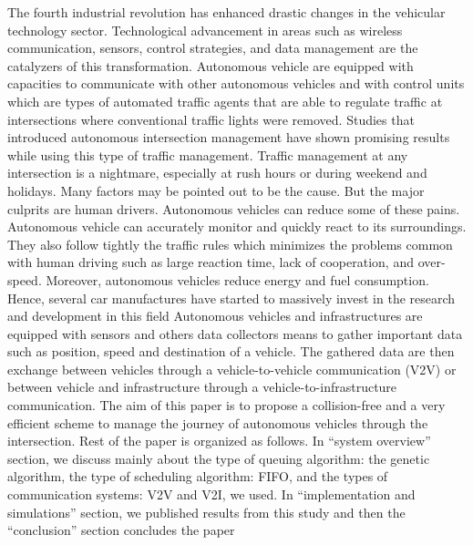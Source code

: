 \documentclass[conference]{IEEEtran}
\begin{document}
The fourth industrial revolution has enhanced drastic changes in the vehicular technology sector. Technological advancement in areas such as wireless communication, sensors, control strategies, and data management are the catalyzers of this transformation. Autonomous vehicle are equipped with capacities to communicate with other autonomous vehicles and with control units which are types of automated traffic agents that are able to regulate traffic at intersections where conventional traffic lights were removed. Studies that introduced autonomous intersection management have shown promising results while using this type of traffic management.    \newline
Traffic management at any intersection is a nightmare, especially at rush hours or during weekend and holidays. Many factors may be pointed out to be the cause. But the major culprits are human drivers. Autonomous vehicles can reduce some of these pains. Autonomous vehicle can accurately monitor and quickly react to its surroundings. They also follow tightly the traffic rules which minimizes the problems common with human driving such as large reaction time, lack of cooperation, and over-speed. Moreover, autonomous vehicles reduce energy and fuel consumption. Hence, several car manufactures have started to massively invest in the research and development in this field\newline
Autonomous vehicles and infrastructures are equipped with sensors and others data collectors means to gather important data such as position, speed and destination of a vehicle. The gathered data are then exchange between vehicles through a vehicle-to-vehicle communication (V2V) or between vehicle and infrastructure through a vehicle-to-infrastructure communication.  \newline
The aim of this paper is to propose a collision-free and a very efficient scheme to manage the journey of autonomous vehicles through the intersection. \newline
Rest of the paper is organized as follows. In “system overview” section, we discuss mainly about the type of queuing algorithm: the genetic algorithm, the type of scheduling algorithm: FIFO, and the types of communication systems: V2V and V2I, we used. In “implementation and simulations” section, we published results from this study and then the “conclusion” section concludes the paper
\end{document}

